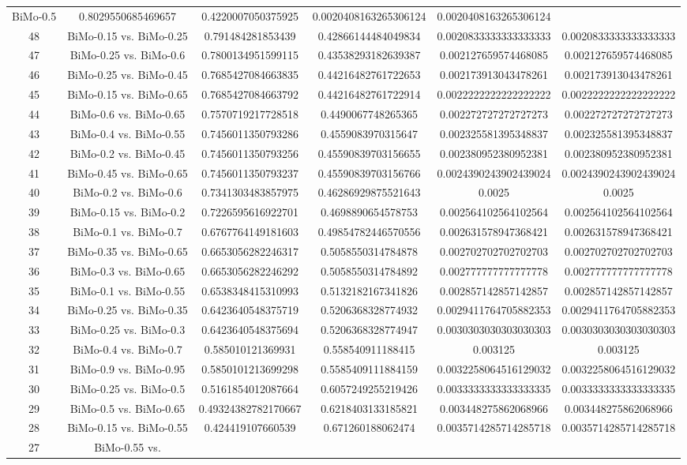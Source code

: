 \documentclass[a4paper,10pt]{article}
\begin{document}
\begin{landscape}
\begin{table}[!htp]
\begin{tabular}{cccccc}
BiMo-0.5&0.8029550685469657&0.4220007050375925&0.0020408163265306124&0.0020408163265306124\\48&BiMo-0.15 vs. BiMo-0.25&0.791484281853439&0.42866144484049834&0.0020833333333333333&0.0020833333333333333\\47&BiMo-0.25 vs. BiMo-0.6&0.7800134951599115&0.43538293182639387&0.002127659574468085&0.002127659574468085\\46&BiMo-0.25 vs. BiMo-0.45&0.7685427084663835&0.44216482761722653&0.002173913043478261&0.002173913043478261\\45&BiMo-0.15 vs. BiMo-0.65&0.7685427084663792&0.44216482761722914&0.0022222222222222222&0.0022222222222222222\\44&BiMo-0.6 vs. BiMo-0.65&0.7570719217728518&0.4490067748265365&0.002272727272727273&0.002272727272727273\\43&BiMo-0.4 vs. BiMo-0.55&0.7456011350793286&0.4559083970315647&0.002325581395348837&0.002325581395348837\\42&BiMo-0.2 vs. BiMo-0.45&0.7456011350793256&0.45590839703156655&0.002380952380952381&0.002380952380952381\\41&BiMo-0.45 vs. BiMo-0.65&0.7456011350793237&0.45590839703156766&0.0024390243902439024&0.0024390243902439024\\40&BiMo-0.2 vs. BiMo-0.6&0.7341303483857975&0.46286929875521643&0.0025&0.0025\\39&BiMo-0.15 vs. BiMo-0.2&0.7226595616922701&0.4698890654578753&0.002564102564102564&0.002564102564102564\\38&BiMo-0.1 vs. BiMo-0.7&0.6767764149181603&0.49854782446570556&0.002631578947368421&0.002631578947368421\\37&BiMo-0.35 vs. BiMo-0.65&0.6653056282246317&0.5058550314784878&0.002702702702702703&0.002702702702702703\\36&BiMo-0.3 vs. BiMo-0.65&0.6653056282246292&0.5058550314784892&0.002777777777777778&0.002777777777777778\\35&BiMo-0.1 vs. BiMo-0.55&0.6538348415310993&0.5132182167341826&0.002857142857142857&0.002857142857142857\\34&BiMo-0.25 vs. BiMo-0.35&0.6423640548375719&0.5206368328774932&0.0029411764705882353&0.0029411764705882353\\33&BiMo-0.25 vs. BiMo-0.3&0.6423640548375694&0.5206368328774947&0.0030303030303030303&0.0030303030303030303\\32&BiMo-0.4 vs. BiMo-0.7&0.585010121369931&0.558540911188415&0.003125&0.003125\\31&BiMo-0.9 vs. BiMo-0.95&0.5850101213699298&0.5585409111884159&0.0032258064516129032&0.0032258064516129032\\30&BiMo-0.25 vs. BiMo-0.5&0.5161854012087664&0.6057249255219426&0.0033333333333333335&0.0033333333333333335\\29&BiMo-0.5 vs. BiMo-0.65&0.49324382782170667&0.6218403133185821&0.003448275862068966&0.003448275862068966\\28&BiMo-0.15 vs. BiMo-0.55&0.424419107660539&0.671260188062474&0.0035714285714285718&0.0035714285714285718\\27&BiMo-0.55 vs. 
\end{tabular}
\end{table}
\end{landscape}
\end{document}

